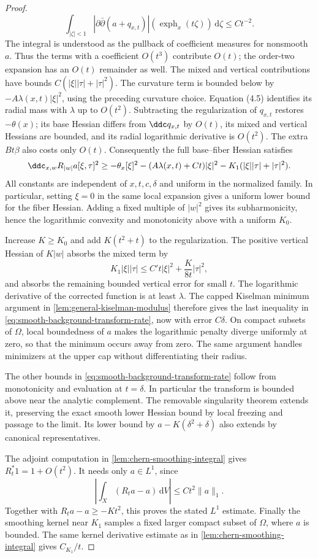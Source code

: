 \begin{proof}
\[
 \int_{|\zeta|<1}|\partial\bar\partial(a+q_{x,t})|
       (\operatorname{exph}_x(t\zeta))\,\mathrm{d}\zeta
 \leq Ct^{-2}.
\]
The integral is understood as the pullback of coefficient measures for
nonsmooth $a$. Thus the terms with a coefficient $O(t^3)$ contribute
$O(t)$; the order-two expansion has an $O(t)$ remainder as well.
The mixed and vertical contributions have bounds
$C(|\xi||\tau|+|\tau|^2)$. The curvature term is bounded below by
$-A\lambda(x,t)|\xi|^2$, using the preceding curvature choice.
Equation (4.5) identifies its radial mass with $\lambda$ up to $O(t^2)$.
Subtracting the regularization of $q_{x,t}$ restores $-\theta(x)$;
its base Hessian differs from $\ddc q_{x,t}$ by $O(t)$, its mixed and
vertical Hessians are bounded, and its radial logarithmic derivative
is $O(t^2)$. The extra $Bt\beta$ also costs only $O(t)$.
Consequently the full base--fiber Hessian satisfies
\[
 \ddc_{x,w}R_{|w|}a[\xi,\tau]^2
 \geq-\theta_x[\xi]^2-(A\lambda(x,t)+Ct)|\xi|^2
       -K_1(|\xi||\tau|+|\tau|^2).
\]
All constants are independent of $x,t,c,\delta$ and uniform in the
normalized family. In particular, setting $\xi=0$ in the same local
expansion gives a uniform lower bound for the fiber Hessian. Adding a
fixed multiple of $|w|^2$ gives its subharmonicity, hence the
logarithmic convexity and monotonicity above with a uniform $K_0$.

Increase $K\geq K_0$ and add $K(t^2+t)$ to the regularization. The
positive vertical Hessian of $K|w|$ absorbs the mixed term by
\[
 K_1|\xi||\tau|\leq C't|\xi|^2+\frac{K}{8t}|\tau|^2,
\]
and absorbs the remaining bounded vertical error for small $t$.
The logarithmic derivative of the corrected function is at least
$\lambda$. The capped Kiselman minimum argument in
\cref{lem:general-kiselman-modulus} therefore gives the last inequality
in \eqref{eq:smooth-background-transform-rate}, now with error $C\delta$.
On compact subsets of $\Omega$, local boundedness of $a$ makes the
logarithmic penalty diverge uniformly at zero, so that the minimum
occurs away from zero. The same argument handles minimizers at the
upper cap without differentiating their radius.

The other bounds in \eqref{eq:smooth-background-transform-rate} follow
from monotonicity and evaluation at $t=\delta$. In particular the
transform is bounded above near the analytic complement. The removable
singularity theorem extends it, preserving the exact smooth lower
Hessian bound by local freezing and passage to the limit. Its lower
bound by $a-K(\delta^2+\delta)$ also extends by canonical representatives.

The adjoint computation in \cref{lem:chern-smoothing-integral} gives
$R_t^*1=1+O(t^2)$. It needs only $a\in L^1$, since
\[
 \left|\int_X(R_ta-a)\,\mathrm{d}V\right|
 \leq Ct^2\|a\|_1.
\]
Together with $R_ta-a\geq-Kt^2$, this proves the stated $L^1$ estimate.
Finally the smoothing kernel near $K_1$ samples a fixed larger compact
subset of $\Omega$, where $a$ is bounded. The same kernel derivative
estimate as in \cref{lem:chern-smoothing-integral} gives $C_{K_1}/t$.
\end{proof}

